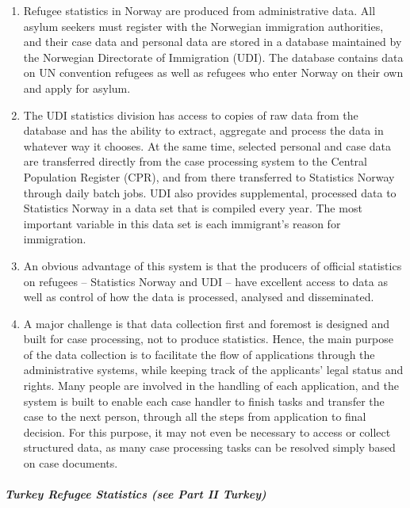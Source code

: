 \documentclass[
]{article}
\begin{document}
\begin{enumerate}
\def\labelenumi{\arabic{enumi}.}
\setcounter{enumi}{162}
\item
  Refugee statistics in Norway are produced from administrative data.
  All asylum seekers must register with the Norwegian immigration
  authorities, and their case data and personal data are stored in a
  database maintained by the Norwegian Directorate of Immigration
  (UDI). The database contains data on UN convention refugees as well
  as refugees who enter Norway on their own and apply for asylum.
\item
  The UDI statistics division has access to copies of raw data from
  the database and has the ability to extract, aggregate and process
  the data in whatever way it chooses. At the same time, selected
  personal and case data are transferred directly from the case
  processing system to the Central Population Register (CPR), and from
  there transferred to Statistics Norway through daily batch jobs. UDI
  also provides supplemental, processed data to Statistics Norway in a
  data set that is compiled every year. The most important variable in
  this data set is each immigrant's reason for immigration.
\item
  An obvious {advantage} of this system is that the
  producers of official statistics on refugees -- Statistics Norway
  and UDI -- have excellent access to data as well as control of how
  the data is processed, analysed and disseminated.
\item
  A major {challenge} is that data collection first and
  foremost is designed and built for case processing, not to produce
  statistics. Hence, the main purpose of the data collection is to
  facilitate the flow of applications through the administrative
  systems, while keeping track of the applicants' legal status and
  rights. Many people are involved in the handling of each
  application, and the system is built to enable each case handler to
  finish tasks and transfer the case to the next person, through all
  the steps from application to final decision. For this purpose, it
  may not even be necessary to access or collect structured data, as
  many case processing tasks can be resolved simply based on case
  documents.
\end{enumerate}

\hypertarget{turkey-refugee-statistics-see-part-ii-turkey}{%
\subparagraph{Turkey Refugee Statistics (see Part II Turkey)}\label{turkey-refugee-statistics-see-part-ii-turkey}}
\end{document}
